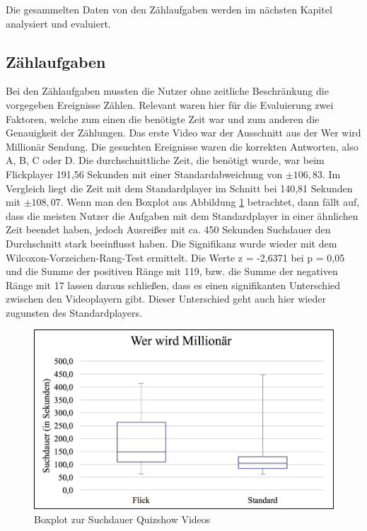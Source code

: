 \documentclass[11pt,a4paper]{report}
\begin{document}
Die gesammelten Daten von den Zählaufgaben werden im nächsten Kapitel analysiert und evaluiert.

\subsection{Zählaufgaben}

Bei den Zählaufgaben mussten die Nutzer ohne zeitliche Beschränkung die vorgegeben Ereignisse Zählen. Relevant waren hier für die Evaluierung zwei Faktoren, welche zum einen die benötigte Zeit war und zum anderen die Genauigkeit der Zählungen. Das erste Video war der Ausschnitt aus der Wer wird Millionär Sendung. Die gesuchten Ereignisse waren die korrekten Antworten, also A, B, C oder D. Die durchschnittliche Zeit, die benötigt wurde, war beim Flickplayer 191,56 Sekunden mit einer Standardabweichung von $\pm 106,83$. Im Vergleich liegt die Zeit mit dem Standardplayer im Schnitt bei 140,81 Sekunden mit $\pm 108,07$. Wenn man den Boxplot aus Abbildung \ref{boxplot_quizshow} betrachtet, dann fällt auf, dass die meisten Nutzer die Aufgaben mit dem Standardplayer in einer ähnlichen Zeit beendet haben, jedoch Ausreißer mit ca. 450 Sekunden Suchdauer den Durchschnitt stark beeinflusst haben. Die Signifikanz wurde wieder mit dem Wilcoxon-Vorzeichen-Rang-Test ermittelt. Die Werte z = -2,6371 bei p = 0,05 und die Summe der positiven Ränge mit 119, bzw. die Summe der negativen Ränge mit 17 lassen daraus schließen, dass es einen signifikanten Unterschied zwischen den Videoplayern gibt. Dieser Unterschied geht auch hier wieder zugunsten des Standardplayers.
\begin{figure}[h]
\begin{center}
\includegraphics[scale=0.9]{./images/35.png}
\caption{Boxplot zur Suchdauer Quizshow Videos}
\label{boxplot_quizshow}
\end{center}
\end{figure}
\end{document}
